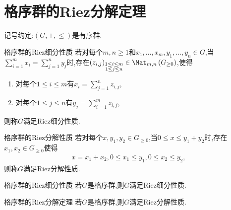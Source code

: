 \section{格序群的Riez分解定理}

记号约定:$\left(G,+,\leq\right)$是有序群.

\begin{definition}{格序群的Riez细分性质}{}
	若对每个$m,n\geq 1$和$x_{1},\ldots,x_{m},y_{1},\ldots,y_{n}\in G$,当$\sum\limits_{i=1}^{m}x_{i}=\sum\limits_{j=1}^{n}y_{j}$时,存在$\left(z_{i,j}\right)_{\substack{1\leq i\leq m\\ 1\leq j\leq n}}\in\Mat_{m,n}\left(G_{\geq 0}\right)$,使得
	\begin{enumerate}
		\item 对每个$1\leq i\leq m$有$x_{i}=\sum\limits_{j=1}^{n}z_{i,j}$,
		\item 对每个$1\leq j\leq n$有$y_{j}=\sum\limits_{i=1}^{m}z_{i,j}$,
	\end{enumerate}
	则称$G$满足Riez细分性质.
\end{definition}

\begin{definition}{格序群的Riez分解性质}{}
	若对每个$x,y_{1},y_{2}\in G_{\geq 0}$,当$0\leq x\leq y_{1}+y_{2}$时,存在$x_{1},x_{2}\in G_{\geq 0}$使得
	\begin{align*}
		x=x_{1}+x_{2},0\leq x_{1}\leq y_{1},0\leq x_{2}\leq y_{2},
	\end{align*}
	则称$G$满足Riez分解性质.
\end{definition}

\begin{theorem}{格序群的Riez细分性质}{}
	若$G$是格序群,则$G$满足Riez细分性质.
\end{theorem}

\begin{corollary}{格序群的Riez分解定理}{}
	若$G$是格序群,则$G$满足Riez分解性质.
\end{corollary}